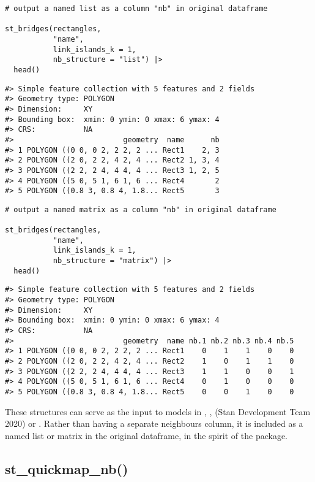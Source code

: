 \begin{verbatim}
# output a named list as a column "nb" in original dataframe

st_bridges(rectangles, 
           "name", 
           link_islands_k = 1, 
           nb_structure = "list") |> 
  head()
\end{verbatim}

\begin{verbatim}
#> Simple feature collection with 5 features and 2 fields
#> Geometry type: POLYGON
#> Dimension:     XY
#> Bounding box:  xmin: 0 ymin: 0 xmax: 6 ymax: 4
#> CRS:           NA
#>                         geometry  name      nb
#> 1 POLYGON ((0 0, 0 2, 2 2, 2 ... Rect1    2, 3
#> 2 POLYGON ((2 0, 2 2, 4 2, 4 ... Rect2 1, 3, 4
#> 3 POLYGON ((2 2, 2 4, 4 4, 4 ... Rect3 1, 2, 5
#> 4 POLYGON ((5 0, 5 1, 6 1, 6 ... Rect4       2
#> 5 POLYGON ((0.8 3, 0.8 4, 1.8... Rect5       3
\end{verbatim}

\begin{verbatim}
# output a named matrix as a column "nb" in original dataframe

st_bridges(rectangles, 
           "name", 
           link_islands_k = 1, 
           nb_structure = "matrix") |> 
  head()
\end{verbatim}

\begin{verbatim}
#> Simple feature collection with 5 features and 2 fields
#> Geometry type: POLYGON
#> Dimension:     XY
#> Bounding box:  xmin: 0 ymin: 0 xmax: 6 ymax: 4
#> CRS:           NA
#>                         geometry  name nb.1 nb.2 nb.3 nb.4 nb.5
#> 1 POLYGON ((0 0, 0 2, 2 2, 2 ... Rect1    0    1    1    0    0
#> 2 POLYGON ((2 0, 2 2, 4 2, 4 ... Rect2    1    0    1    1    0
#> 3 POLYGON ((2 2, 2 4, 4 4, 4 ... Rect3    1    1    0    0    1
#> 4 POLYGON ((5 0, 5 1, 6 1, 6 ... Rect4    0    1    0    0    0
#> 5 POLYGON ((0.8 3, 0.8 4, 1.8... Rect5    0    0    1    0    0
\end{verbatim}

These structures can serve as the input to models in ,
,  (Stan Development Team 2020) or . Rather than having a separate neighbours
column, it is included as a named list or matrix in the original 
dataframe, in the spirit of the  package.

\hypertarget{st_quickmap_nb}{%
\subsection{st\_quickmap\_nb()}\label{st_quickmap_nb}}

